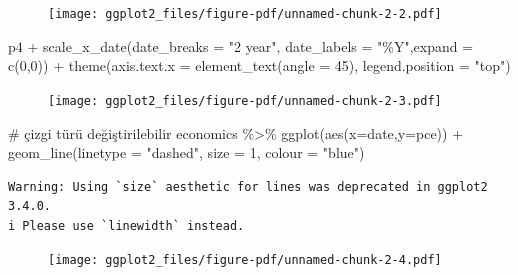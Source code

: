 \documentclass[
  letterpaper,
  DIV=11,
  numbers=noendperiod]{scrreprt}
\newenvironment{Shaded}{\begin{snugshade}}{\end{snugshade}}
\newcommand{\AttributeTok}[1]{\textcolor[rgb]{0.40,0.45,0.13}{#1}}
\newcommand{\CommentTok}[1]{\textcolor[rgb]{0.37,0.37,0.37}{#1}}
\newcommand{\DecValTok}[1]{\textcolor[rgb]{0.68,0.00,0.00}{#1}}
\newcommand{\FunctionTok}[1]{\textcolor[rgb]{0.28,0.35,0.67}{#1}}
\newcommand{\NormalTok}[1]{\textcolor[rgb]{0.00,0.23,0.31}{#1}}
\newcommand{\SpecialCharTok}[1]{\textcolor[rgb]{0.37,0.37,0.37}{#1}}
\newcommand{\StringTok}[1]{\textcolor[rgb]{0.13,0.47,0.30}{#1}}
\begin{document}
\begin{figure}[H]

{\centering \texttt{[image: ggplot2\_files/figure-pdf/unnamed-chunk-2-2.pdf]}

}

\end{figure}

\begin{Shaded}
\begin{Highlighting}[]
\NormalTok{p4 }\SpecialCharTok{+} 
  \FunctionTok{scale\_x\_date}\NormalTok{(}\AttributeTok{date\_breaks =} \StringTok{"2 year"}\NormalTok{, }\AttributeTok{date\_labels =} \StringTok{"\%Y"}\NormalTok{,}\AttributeTok{expand =} \FunctionTok{c}\NormalTok{(}\DecValTok{0}\NormalTok{,}\DecValTok{0}\NormalTok{)) }\SpecialCharTok{+}
  \FunctionTok{theme}\NormalTok{(}\AttributeTok{axis.text.x =} \FunctionTok{element\_text}\NormalTok{(}\AttributeTok{angle =} \DecValTok{45}\NormalTok{), }\AttributeTok{legend.position =} \StringTok{"top"}\NormalTok{)}
\end{Highlighting}
\end{Shaded}

\begin{figure}[H]

{\centering \texttt{[image: ggplot2\_files/figure-pdf/unnamed-chunk-2-3.pdf]}

}

\end{figure}

\begin{Shaded}
\begin{Highlighting}[]
\CommentTok{\# çizgi türü değiştirilebilir}
\NormalTok{economics }\SpecialCharTok{\%\textgreater{}\%} 
  \FunctionTok{ggplot}\NormalTok{(}\FunctionTok{aes}\NormalTok{(}\AttributeTok{x=}\NormalTok{date,}\AttributeTok{y=}\NormalTok{pce)) }\SpecialCharTok{+}
  \FunctionTok{geom\_line}\NormalTok{(}\AttributeTok{linetype =} \StringTok{"dashed"}\NormalTok{, }\AttributeTok{size =} \DecValTok{1}\NormalTok{, }\AttributeTok{colour =} \StringTok{"blue"}\NormalTok{)}
\end{Highlighting}
\end{Shaded}

\begin{verbatim}
Warning: Using `size` aesthetic for lines was deprecated in ggplot2 3.4.0.
i Please use `linewidth` instead.
\end{verbatim}

\begin{figure}[H]

{\centering \texttt{[image: ggplot2\_files/figure-pdf/unnamed-chunk-2-4.pdf]}

}

\end{figure}
\end{document}
